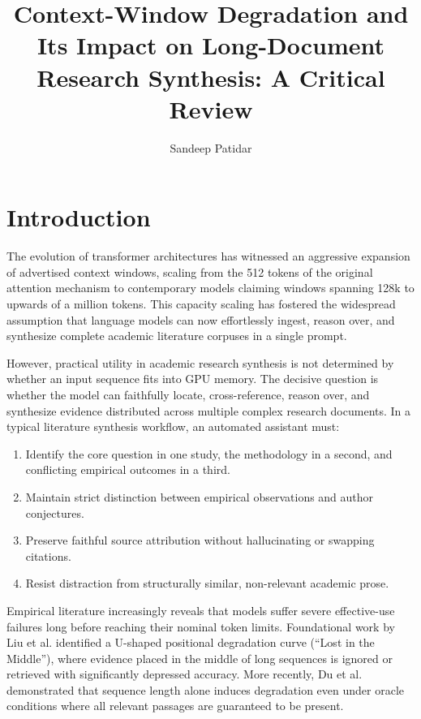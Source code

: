 \documentclass[manuscript,screen,oneside]{acmart}
\title{Context-Window Degradation and Its Impact on Long-Document Research Synthesis: A Critical Review}
\author{Sandeep Patidar}
\affiliation{%
  \institution{Postgraduate Research in Computing, Enrollment: MNS2026001}
  \city{New Delhi}
  \country{India}
}
\begin{document}
\maketitle

\section{Introduction}\label{sec:intro}
The evolution of transformer architectures has witnessed an aggressive expansion of advertised context windows, scaling from the 512 tokens of the original attention mechanism \cite{vaswani2017attention} to contemporary models claiming windows spanning 128k to upwards of a million tokens. This capacity scaling has fostered the widespread assumption that language models can now effortlessly ingest, reason over, and synthesize complete academic literature corpuses in a single prompt.

However, practical utility in academic research synthesis is not determined by whether an input sequence fits into GPU memory. The decisive question is whether the model can faithfully locate, cross-reference, reason over, and synthesize evidence distributed across multiple complex research documents. In a typical literature synthesis workflow, an automated assistant must:
\begin{enumerate}
    \item Identify the core question in one study, the methodology in a second, and conflicting empirical outcomes in a third.
    \item Maintain strict distinction between empirical observations and author conjectures.
    \item Preserve faithful source attribution without hallucinating or swapping citations.
    \item Resist distraction from structurally similar, non-relevant academic prose.
\end{enumerate}

Empirical literature increasingly reveals that models suffer severe effective-use failures long before reaching their nominal token limits. Foundational work by Liu et al. \cite{liu2024lost} identified a U-shaped positional degradation curve (``Lost in the Middle''), where evidence placed in the middle of long sequences is ignored or retrieved with significantly depressed accuracy. More recently, Du et al. \cite{du2025contextlength} demonstrated that sequence length alone induces degradation even under oracle conditions where all relevant passages are guaranteed to be present.
\end{document}
